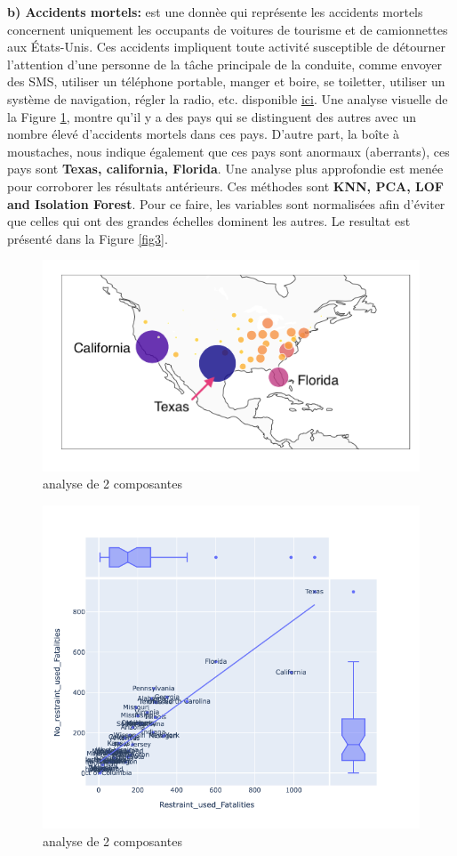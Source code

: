 \noindent\textbf{b) Accidents mortels:}
 est une donnèe qui représente les accidents mortels concernent uniquement les occupants de voitures de tourisme et de camionnettes aux États-Unis. Ces accidents impliquent toute activité susceptible de détourner l'attention d'une personne de la tâche principale de la conduite, comme envoyer des SMS, utiliser un téléphone portable, manger et boire, se toiletter, utiliser un système de navigation, régler la radio, etc. disponible  \href{https://www.bts.dot.gov/content/passenger-car-and-light-truck-occupants-killed-and-restraint-use}{\underline{ici}}. Une analyse visuelle de la Figure \ref{fig2}, montre qu'il y a des pays qui se distinguent des autres avec un nombre élevé d'accidents mortels dans ces pays. D'autre part, la boîte à moustaches, nous indique également que ces pays sont anormaux (aberrants), ces pays sont \textbf{Texas, california, Florida}. Une analyse plus approfondie est menée pour corroborer les résultats antérieurs. Ces méthodes sont \textbf{ KNN, PCA, LOF and Isolation Forest}. Pour ce faire, les variables sont normalisées afin d’éviter que celles qui ont des grandes échelles dominent les autres. Le resultat est présenté dans la Figure \ref{fig3}. 
\begin{figure}[H]
    \centering
    \includegraphics[width=.5\textwidth]{ADOA/Images/fat1png.png}
    \caption{analyse de 2 composantes}%
    \label{fig2}
\end{figure}

 \begin{figure}[ht]
    \centering
    \includegraphics[width=.50\textwidth]{ADOA/Images/Fatal1.png}
    \caption{analyse de 2 composantes}%
    \label{fig2a}
\end{figure}

